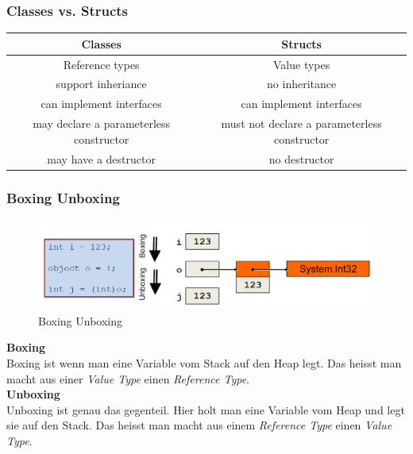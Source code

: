 \subsubsection{Classes vs. Structs}
\begin{tabular}{|c|c|}
	\hline
	           \textbf{Classes }            &               \textbf{Structs}               \\ \hline
	            Reference types             &                 Value types                  \\ \hline
	          support inheriance            &                no inheritance                \\ \hline
	       can implement interfaces        &          can implement interfaces           \\ \hline
	may declare a parameterless constructor & must not declare a parameterless constructor \\ \hline
	         may have a destructor          &                no destructor                 \\ \hline
\end{tabular} 

\subsubsection{Boxing Unboxing}
\begin{figure}[h]
	\centering
	\includegraphics[height=3cm, ]{images/CSharp/BoxingUnboxing}
	\caption{Boxing Unboxing}	
\end{figure}

\textbf{Boxing}\\
Boxing ist wenn man eine Variable vom Stack auf den Heap legt. Das heisst man macht aus einer \textit{Value Type} einen \textit{Reference Type}.\\ 

\textbf{Unboxing}\\
Unboxing ist genau das gegenteil. Hier holt man eine Variable vom Heap und legt sie auf den Stack. Das heisst man macht aus einem \textit{Reference Type} einen \textit{Value Type}.

